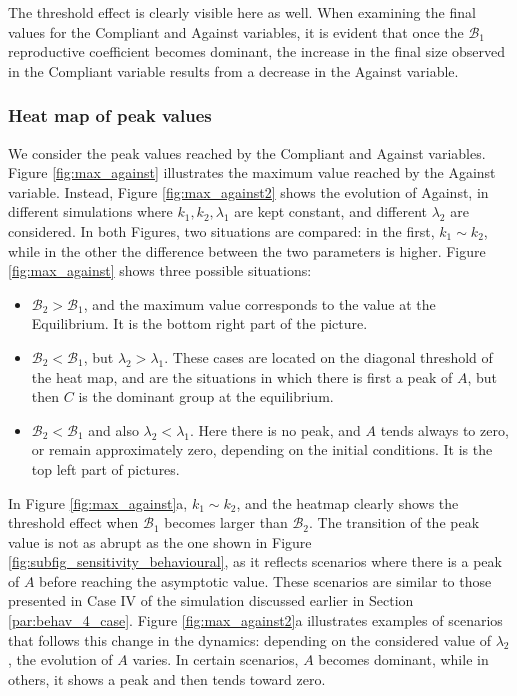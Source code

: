 The threshold effect is clearly visible here as well. When examining the final values for the Compliant and Against variables, it is evident that once the $\mathcal{B}_1$ reproductive coefficient becomes dominant, the increase in the final size observed in the Compliant variable results from a decrease in the Against variable.

\subsubsection{Heat map of peak values}
We consider the peak values reached by the Compliant and Against variables. Figure \ref{fig:max_against} illustrates the maximum value reached by the Against variable. Instead, Figure \ref{fig:max_against2} shows the evolution of Against, in different simulations where $k_1, k_2, \lambda_1$ are kept constant, and different $\lambda_2$ are considered.
In both Figures, two situations are compared: in the first, $k_1 \sim k_2$, while in the other the difference between the two parameters is higher. Figure \ref{fig:max_against} shows three possible situations:

\begin{itemize}
	\item $\mathcal{B}_2 > \mathcal{B}_1$, and the maximum value corresponds to the value at the Equilibrium. It is the bottom right part of the picture.
	\item $\mathcal{B}_2 < \mathcal{B}_1$, but $\lambda_2 > \lambda_1$. These cases are located on the diagonal threshold of the heat map, and are the situations in which there is first a peak of $A$, but then $C$ is the dominant group at the equilibrium.
	\item $\mathcal{B}_2 < \mathcal{B}_1$ and also $\lambda_2 < \lambda_1$. Here there is no peak, and $A$ tends always to zero, or remain approximately zero, depending on the initial conditions. It is the top left part of pictures. 
\end{itemize}

In Figure \ref{fig:max_against}a, \(k_1 \sim k_2\), and the heatmap clearly shows the threshold effect when \(\mathcal{B}_1\) becomes larger than \(\mathcal{B}_2\). The transition of the peak value is not as abrupt as the one shown in Figure \ref{fig:subfig_sensitivity_behavioural}, as it reflects scenarios where there is a peak of \(A\) before reaching the asymptotic value.
These scenarios are similar to those presented in Case IV of the simulation discussed earlier in Section \ref{par:behav_4_case}.
 Figure \ref{fig:max_against2}a illustrates examples of scenarios that follows this change in the dynamics: depending on the considered value of \(\lambda_2\), the evolution of \(A\) varies. In certain scenarios, \(A\) becomes dominant, while in others, it shows a peak and then tends toward zero.


